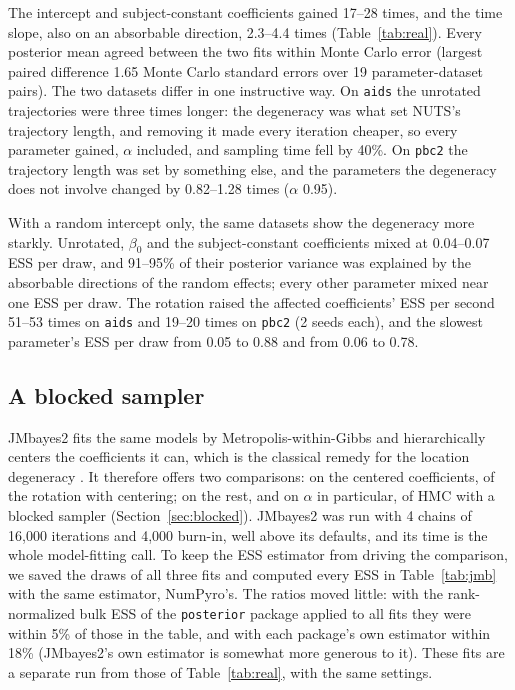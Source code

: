 The intercept and subject-constant coefficients gained 17--28 times, and the time slope, also on an absorbable direction, 2.3--4.4 times (Table~\ref{tab:real}). Every posterior mean agreed
between the two fits within Monte Carlo error (largest paired difference
1.65 Monte Carlo standard errors over 19 parameter-dataset pairs). The two
datasets differ in one instructive way. On \texttt{aids} the unrotated
trajectories were three times longer: the degeneracy was what set NUTS's
trajectory length, and removing it made every iteration cheaper, so every
parameter gained, $\alpha$ included, and sampling time fell by 40\%. On
\texttt{pbc2} the trajectory length was set by something else, and the
parameters the degeneracy does not involve changed by 0.82--1.28 times ($\alpha$ 0.95).

With a random intercept only, the same datasets show the degeneracy more
starkly. Unrotated, $\beta_0$ and the subject-constant coefficients mixed
at 0.04--0.07 ESS per draw, and 91--95\% of their posterior variance was
explained by the absorbable directions of the random effects; every other
parameter mixed near one ESS per draw. The rotation raised the affected
coefficients' ESS per second 51--53 times on \texttt{aids} and 19--20
times on \texttt{pbc2} (2 seeds each), and the slowest parameter's ESS per
draw from 0.05 to 0.88 and from 0.06 to 0.78.

\subsection{A blocked sampler}

JMbayes2 \citep{jmbayes2} fits the same models by Metropolis-within-Gibbs
and hierarchically centers the coefficients it can, which is the classical
remedy for the location degeneracy \citep{gelfand1995}. It therefore
offers two comparisons: on the centered coefficients, of the rotation with
centering; on the rest, and on $\alpha$ in particular, of HMC with a blocked
sampler (Section~\ref{sec:blocked}). JMbayes2 was run with 4 chains of
16,000 iterations and 4,000 burn-in, well above its defaults, and its time
is the whole model-fitting call. To keep the ESS estimator from driving the
comparison, we saved the draws of all three fits and computed every ESS in
Table~\ref{tab:jmb} with the same estimator, NumPyro's. The ratios moved
little: with the rank-normalized bulk ESS of the \texttt{posterior}
package applied to all fits they were within 5\% of those in the table,
and with each package's own estimator within 18\% (JMbayes2's own
estimator is somewhat more generous to it). These fits are a separate run
from those of Table~\ref{tab:real}, with the same settings.

